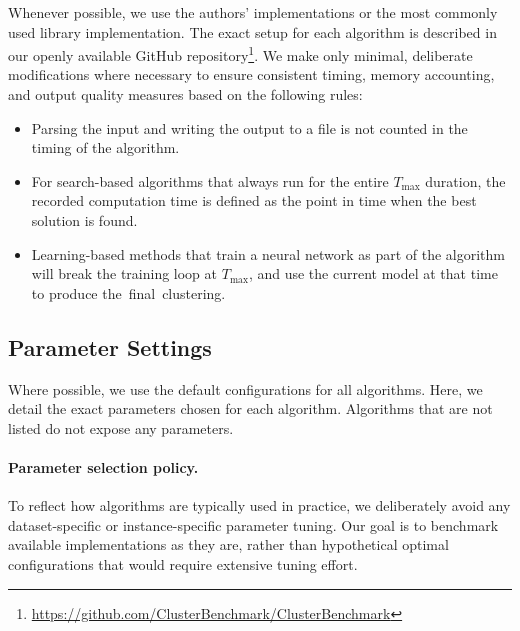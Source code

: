 \documentclass[../paper.tex]{subfiles}
\begin{document}
Whenever possible, we use the authors' implementations or the most commonly used library implementation. The exact setup for each algorithm is described in our openly available GitHub repository\footnote{\url{https://github.com/ClusterBenchmark/ClusterBenchmark}}. We make only minimal, deliberate modifications where necessary to ensure consistent timing, memory accounting, and output quality measures based on the following rules:

\begin{itemize}
    \item Parsing the input and writing the output to a file is not counted in the timing of the algorithm.
    \item For search-based algorithms that always run for the entire $T_{\max}$ duration, the recorded computation time is defined as the point in time when the best solution is found.
    \item Learning-based methods that train a neural network as part of the algorithm will break the training loop at $T_{\max}$, and use the current model at that time to produce \hbox{the final clustering.}
\end{itemize}

\subsection{Parameter Settings}

Where possible, we use the default configurations for all algorithms. Here, we detail the exact parameters chosen for each algorithm. Algorithms that are not listed do not expose any parameters.

\paragraph*{\textbf{Parameter selection policy.}}
To reflect how algorithms are typically used in practice, we deliberately avoid any dataset-specific or instance-specific parameter tuning. Our goal is to benchmark available implementations as they are, rather than hypothetical optimal configurations that would require extensive tuning effort.
\end{document}
